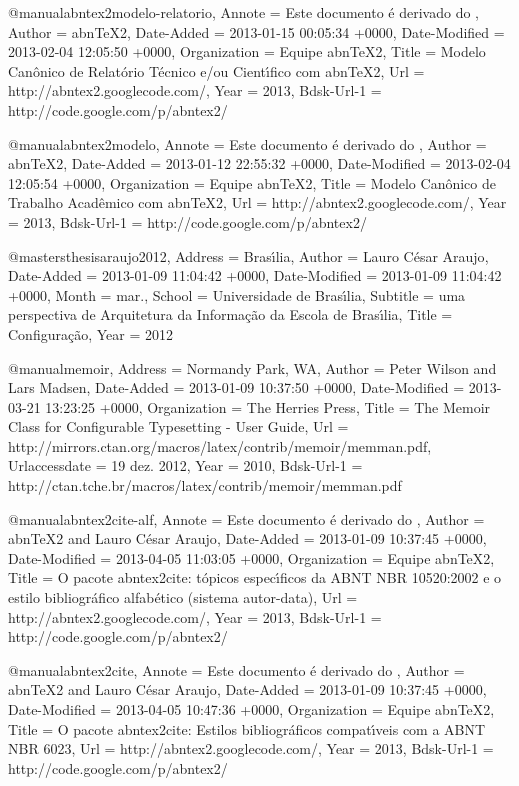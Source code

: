 @manual{abntex2modelo-relatorio,
	Annote = {Este documento {\'e} derivado do \cite{abnt-bibtex-doc}},
	Author = {abnTeX2},
	Date-Added = {2013-01-15 00:05:34 +0000},
	Date-Modified = {2013-02-04 12:05:50 +0000},
	Organization = {Equipe abnTeX2},
	Title = {Modelo Can{\^o}nico de Relat{\'o}rio T{\'e}cnico e/ou Cient{\'\i}fico com abnTeX2},
	Url = {http://abntex2.googlecode.com/},
	Year = {2013},
	Bdsk-Url-1 = {http://code.google.com/p/abntex2/}}

@manual{abntex2modelo,
	Annote = {Este documento {\'e} derivado do \cite{abnt-bibtex-doc}},
	Author = {abnTeX2},
	Date-Added = {2013-01-12 22:55:32 +0000},
	Date-Modified = {2013-02-04 12:05:54 +0000},
	Organization = {Equipe abnTeX2},
	Title = {Modelo Can{\^o}nico de Trabalho Acad{\^e}mico com abnTeX2},
	Url = {http://abntex2.googlecode.com/},
	Year = {2013},
	Bdsk-Url-1 = {http://code.google.com/p/abntex2/}}

@mastersthesis{araujo2012,
	Address = {Bras{\'\i}lia},
	Author = {Lauro C{\'e}sar Araujo},
	Date-Added = {2013-01-09 11:04:42 +0000},
	Date-Modified = {2013-01-09 11:04:42 +0000},
	Month = {mar.},
	School = {Universidade de Bras{\'\i}lia},
	Subtitle = {uma perspectiva de {A}rquitetura da {I}nforma{\c c}{\~a}o da {E}scola de {B}ras{\'\i}lia},
	Title = {Configura{\c c}{\~a}o},
	Year = {2012}}

@manual{memoir,
	Address = {Normandy Park, WA},
	Author = {Peter Wilson and Lars Madsen},
	Date-Added = {2013-01-09 10:37:50 +0000},
	Date-Modified = {2013-03-21 13:23:25 +0000},
	Organization = {The Herries Press},
	Title = {The Memoir Class for Configurable Typesetting - User Guide},
	Url = {http://mirrors.ctan.org/macros/latex/contrib/memoir/memman.pdf},
	Urlaccessdate = {19 dez. 2012},
	Year = {2010},
	Bdsk-Url-1 = {http://ctan.tche.br/macros/latex/contrib/memoir/memman.pdf}}

@manual{abntex2cite-alf,
	Annote = {Este documento {\'e} derivado do \cite{abnt-bibtex-alf-doc}},
	Author = {abnTeX2 and Lauro C{\'e}sar Araujo},
	Date-Added = {2013-01-09 10:37:45 +0000},
	Date-Modified = {2013-04-05 11:03:05 +0000},
	Organization = {Equipe abnTeX2},
	Title = {O pacote abntex2cite: t{\'o}picos espec{\'\i}ficos da ABNT NBR 10520:2002 e o estilo bibliogr{\'a}fico alfab{\'e}tico (sistema autor-data)},
	Url = {http://abntex2.googlecode.com/},
	Year = {2013},
	Bdsk-Url-1 = {http://code.google.com/p/abntex2/}}

@manual{abntex2cite,
	Annote = {Este documento {\'e} derivado do \cite{abnt-bibtex-doc}},
	Author = {abnTeX2 and Lauro C{\'e}sar Araujo},
	Date-Added = {2013-01-09 10:37:45 +0000},
	Date-Modified = {2013-04-05 10:47:36 +0000},
	Organization = {Equipe abnTeX2},
	Title = {O pacote abntex2cite: Estilos bibliogr{\'a}ficos compat{\'\i}veis com a ABNT NBR 6023},
	Url = {http://abntex2.googlecode.com/},
	Year = {2013},
	Bdsk-Url-1 = {http://code.google.com/p/abntex2/}}

